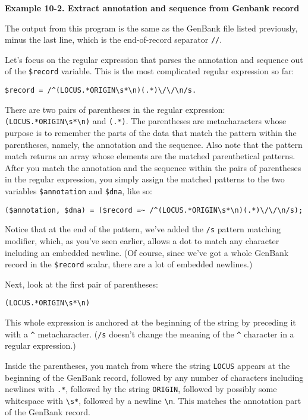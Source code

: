 \textbf{Example 10-2. Extract annotation and sequence from Genbank record}


The output from this program is the same as the GenBank file listed previously, minus the last line, which is the end-of-record separator \verb|//|.

Let's focus on the regular expression that parses the annotation and sequence out of the \verb|$record| variable. This is the most complicated regular expression so far:

\begin{lstlisting}
$record = /^(LOCUS.*ORIGIN\s*\n)(.*)\/\/\n/s.
\end{lstlisting}

There are two pairs of parentheses in the regular expression: \verb|(LOCUS.*ORIGIN\s*\n)| and \verb|(.*)|. The parentheses are metacharacters whose purpose is to remember the parts of the data that match the pattern within the parentheses, namely, the annotation and the sequence. Also note that the pattern match returns an array whose elements are the matched parenthetical patterns. After you match the annotation and the sequence within the pairs of parentheses in the regular expression, you simply assign the matched patterns to the two variables \verb|$annotation| and \verb|$dna|, like so:

\begin{lstlisting}
($annotation, $dna) = ($record =~ /^(LOCUS.*ORIGIN\s*\n)(.*)\/\/\n/s);
\end{lstlisting}

Notice that at the end of the pattern, we've added the \verb|/s| pattern matching modifier, which, as you've seen earlier, allows a dot to match any character including an embedded newline. (Of course, since we've got a whole GenBank record in the \verb|$record| scalar, there are a lot of embedded newlines.)

Next, look at the first pair of parentheses:

\begin{lstlisting}
(LOCUS.*ORIGIN\s*\n)
\end{lstlisting}

This whole expression is anchored at the beginning of the string by preceding it with a \verb|^| metacharacter. (\verb|/s| doesn't change the meaning of the \verb|^| character in a regular expression.)

Inside the parentheses, you match from where the string \verb|LOCUS| appears at the beginning of the GenBank record, followed by any number of characters including newlines with \verb|.*|, followed by the string \verb|ORIGIN|, followed by possibly some whitespace with \verb|\s*|, followed by a newline \verb|\n|. This matches the annotation part of the GenBank record.

